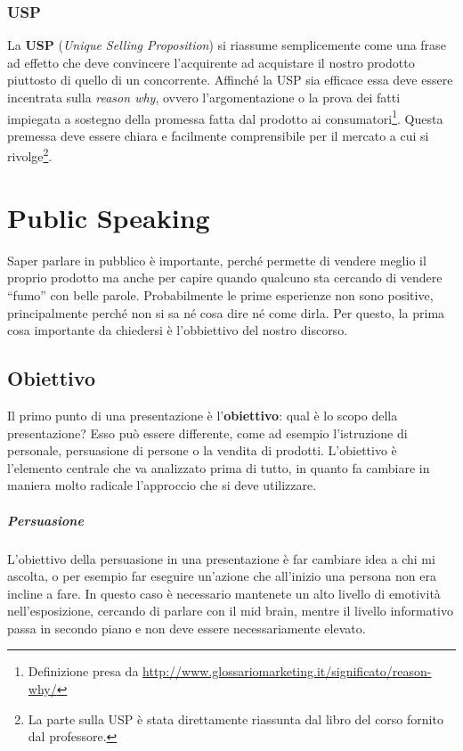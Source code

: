 \subsection{USP}

La \textbf{USP} (\textit{Unique Selling Proposition}) si riassume semplicemente 
come una frase ad effetto che deve convincere l'acquirente ad acquistare il 
nostro prodotto piuttosto di quello di un concorrente.
Affinché la USP sia efficace essa deve essere incentrata sulla \textit{reason 
why}, ovvero l’argomentazione o la prova dei fatti impiegata a sostegno della 
promessa fatta dal prodotto ai consumatori\footnote{Definizione presa da 
\url{http://www.glossariomarketing.it/significato/reason-why/}}. Questa 
premessa deve essere chiara e facilmente comprensibile per il mercato a cui si 
rivolge\footnote{La parte sulla USP è stata direttamente riassunta dal libro 
del corso fornito dal professore.}.

\chapter{Public Speaking}

Saper parlare in pubblico è importante, perché permette di vendere meglio il
proprio prodotto ma anche per capire quando qualcuno sta cercando di vendere
``fumo'' con belle parole. Probabilmente le prime esperienze non sono positive,
principalmente perché non si sa né cosa dire né come dirla. Per questo, la
prima cosa importante da chiedersi è l'obbiettivo del nostro discorso.

\section{Obiettivo}

Il primo punto di una presentazione è l'\textbf{obiettivo}: qual è lo scopo
della presentazione? Esso può essere differente, come ad esempio l'istruzione
di personale, persuasione di persone o la vendita di prodotti. L'obiettivo è
l'elemento centrale che va analizzato prima di tutto, in quanto fa
cambiare in maniera molto radicale l'approccio che si deve utilizzare.

\paragraph*{Persuasione} L'obiettivo della persuasione in una presentazione è
far cambiare idea a chi mi ascolta, o per esempio far eseguire un'azione che
all'inizio una persona non era incline a fare. In questo caso è necessario
mantenete un alto livello di emotività nell'esposizione, cercando di parlare
con il mid brain, mentre il livello informativo passa in secondo piano e non
deve essere necessariamente elevato.

